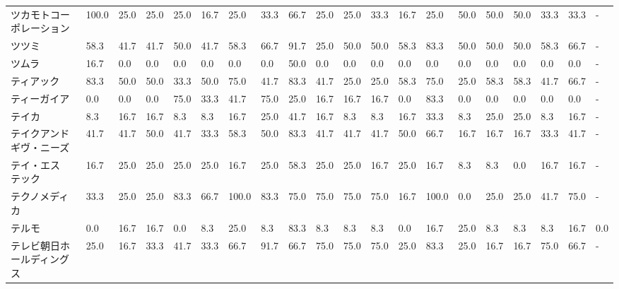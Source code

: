 \documentclass[a4paper，11pt]{jsarticle}
\begin{document}
\begin{longtable}[c]{lp{3mm}p{3mm}p{3mm}p{3mm}p{3mm}p{3mm}p{3mm}p{3mm}p{3mm}p{3mm}p{3mm}p{3mm}p{3mm}p{3mm}p{3mm}p{3mm}p{3mm}p{3mm}p{3mm}}
ツカモトコーポレーション    &  100.0 &   25.0 &      25.0 &      25.0 &       16.7 &   25.0 &   33.3 &   66.7 &    25.0 &    25.0 &   33.3 &  16.7 &   25.0 &    50.0 &    50.0 &  50.0 &  33.3 &  33.3 &     - \\
ツツミ             &   58.3 &   41.7 &      41.7 &      50.0 &       41.7 &   58.3 &   66.7 &   91.7 &    25.0 &    50.0 &   50.0 &  58.3 &   83.3 &    50.0 &    50.0 &  50.0 &  58.3 &  66.7 &     - \\
ツムラ             &   16.7 &    0.0 &       0.0 &       0.0 &        0.0 &    0.0 &    0.0 &   50.0 &     0.0 &     0.0 &    0.0 &   0.0 &    0.0 &     0.0 &     0.0 &   0.0 &   0.0 &   0.0 &     - \\
ティアック           &   83.3 &   50.0 &      50.0 &      33.3 &       50.0 &   75.0 &   41.7 &   83.3 &    41.7 &    25.0 &   25.0 &  58.3 &   75.0 &    25.0 &    58.3 &  58.3 &  41.7 &  66.7 &     - \\
ティーガイア          &    0.0 &    0.0 &       0.0 &      75.0 &       33.3 &   41.7 &   75.0 &   25.0 &    16.7 &    16.7 &   16.7 &   0.0 &   83.3 &     0.0 &     0.0 &   0.0 &   0.0 &   0.0 &     - \\
テイカ             &    8.3 &   16.7 &      16.7 &       8.3 &        8.3 &   16.7 &   25.0 &   41.7 &    16.7 &     8.3 &    8.3 &  16.7 &   33.3 &     8.3 &    25.0 &  25.0 &   8.3 &  16.7 &     - \\
テイクアンドギヴ・ニーズ    &   41.7 &   41.7 &      50.0 &      41.7 &       33.3 &   58.3 &   50.0 &   83.3 &    41.7 &    41.7 &   41.7 &  50.0 &   66.7 &    16.7 &    16.7 &  16.7 &  33.3 &  41.7 &     - \\
テイ・エス　テック       &   16.7 &   25.0 &      25.0 &      25.0 &       25.0 &   16.7 &   25.0 &   58.3 &    25.0 &    25.0 &   16.7 &  25.0 &   16.7 &     8.3 &     8.3 &   0.0 &  16.7 &  16.7 &     - \\
テクノメディカ         &   33.3 &   25.0 &      25.0 &      83.3 &       66.7 &  100.0 &   83.3 &   75.0 &    75.0 &    75.0 &   75.0 &  16.7 &  100.0 &     0.0 &    25.0 &  25.0 &  41.7 &  75.0 &     - \\
テルモ             &    0.0 &   16.7 &      16.7 &       0.0 &        8.3 &   25.0 &    8.3 &   83.3 &     8.3 &     8.3 &    8.3 &   0.0 &   16.7 &    25.0 &     8.3 &   8.3 &   8.3 &  16.7 &   0.0 \\
テレビ朝日ホールディングス   &   25.0 &   16.7 &      33.3 &      41.7 &       33.3 &   66.7 &   91.7 &   66.7 &    75.0 &    75.0 &   75.0 &  25.0 &   83.3 &    25.0 &    16.7 &  16.7 &  75.0 &  66.7 &     - \\

\end{longtable}
\end{document}
